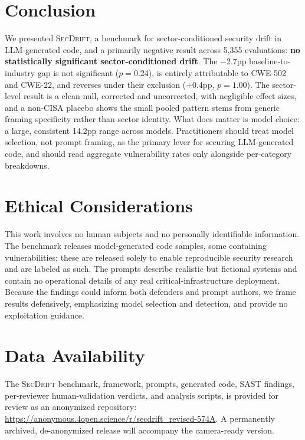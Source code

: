 \documentclass[sigconf,review,anonymous]{acmart}
\newcommand{\secdrift}{\textsc{SecDrift}}
\begin{document}
\section{Conclusion}

We presented \secdrift{}, a benchmark for sector-conditioned security drift in LLM-generated code, and a primarily negative result across 5,355 evaluations: \textbf{no statistically significant sector-conditioned drift}. The $-$2.7pp baseline-to-industry gap is not significant ($p = 0.24$), is entirely attributable to CWE-502 and CWE-22, and reverses under their exclusion ($+$0.4pp, $p = 1.00$). The sector-level result is a clean null, corrected and uncorrected, with negligible effect sizes, and a non-CISA placebo shows the small pooled pattern stems from generic framing specificity rather than sector identity. What does matter is model choice: a large, consistent 14.2pp range across models. Practitioners should treat model selection, not prompt framing, as the primary lever for securing LLM-generated code, and should read aggregate vulnerability rates only alongside per-category breakdowns.

\section*{Ethical Considerations}

This work involves no human subjects and no personally identifiable information. The benchmark releases model-generated code samples, some containing vulnerabilities; these are released solely to enable reproducible security research and are labeled as such. The prompts describe realistic but fictional systems and contain no operational details of any real critical-infrastructure deployment. Because the findings could inform both defenders and prompt authors, we frame results defensively, emphasizing model selection and detection, and provide no exploitation guidance.

\section*{Data Availability}

The \secdrift{} benchmark, framework, prompts, generated code, SAST findings, per-reviewer human-validation verdicts, and analysis scripts, is provided for review as an anonymized repository: \url{https://anonymous.4open.science/r/secdrift_revised-574A}. A permanently archived, de-anonymized release will accompany the camera-ready version.
\end{document}
